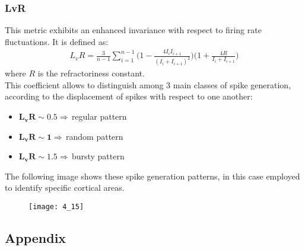 \subsubsection{LvR}
This metric exhibits an enhanced invariance with respect to firing rate fluctuations. It is defined as:
\begin{align*}
    L_{v}R
    =\frac{3}{n-1}\sum_{i=1}^{n-1}\biggl(1-\frac{4I_{i}I_{i+1}}{(I_{i}+I_{i+1})^2}\biggr)\biggl(1+\frac{4R}{I_{i}+I_{i+1}}\biggr)
\end{align*}
where \(R\) is the refractoriness constant.\\
This coefficient allows to distinguish among 3 main classes of spike generation,
according to the displacement of spikes with respect to one another:
\begin{itemize}
    \item \(\mathbf{L_{v}R\sim0.5}\Rightarrow\,\)regular pattern
    \item \(\mathbf{L_{v}R\sim1}\Rightarrow\,\)random pattern
    \item \(\mathbf{L_{v}R\sim1.5}\Rightarrow\,\)bursty pattern
\end{itemize}
The following image shows these spike generation patterns, in this case employed to identify specific cortical areas.
\begin{figure}[H]
    \texttt{[image: 4\_15]}
    \centering
\end{figure}

\subsection{Appendix}
